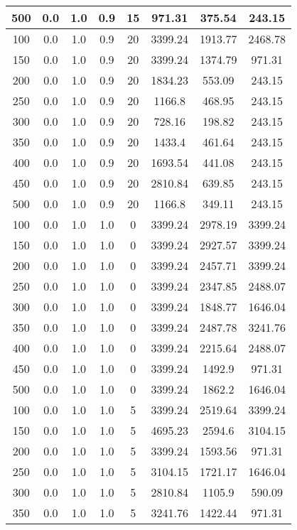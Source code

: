 \documentclass[a4paper, 12pt]{extreport}
\begin{document}
\begin{itemize}
\begin{longtable}{|c|c|c|c|c|c|c|c|}
			500 & 0.0 & 1.0 & 0.9 & 15 & 971.31 & 375.54 & 243.15 \\\hline
			100 & 0.0 & 1.0 & 0.9 & 20 & 3399.24 & 1913.77 & 2468.78 \\\hline
			150 & 0.0 & 1.0 & 0.9 & 20 & 3399.24 & 1374.79 & 971.31 \\\hline
			200 & 0.0 & 1.0 & 0.9 & 20 & 1834.23 & 553.09 & 243.15 \\\hline
			250 & 0.0 & 1.0 & 0.9 & 20 & 1166.8 & 468.95 & 243.15 \\\hline
			300 & 0.0 & 1.0 & 0.9 & 20 & 728.16 & 198.82 & 243.15 \\\hline
			350 & 0.0 & 1.0 & 0.9 & 20 & 1433.4 & 461.64 & 243.15 \\\hline
			400 & 0.0 & 1.0 & 0.9 & 20 & 1693.54 & 441.08 & 243.15 \\\hline
			450 & 0.0 & 1.0 & 0.9 & 20 & 2810.84 & 639.85 & 243.15 \\\hline
			500 & 0.0 & 1.0 & 0.9 & 20 & 1166.8 & 349.11 & 243.15 \\\hline
			100 & 0.0 & 1.0 & 1.0 & 0 & 3399.24 & 2978.19 & 3399.24 \\\hline
			150 & 0.0 & 1.0 & 1.0 & 0 & 3399.24 & 2927.57 & 3399.24 \\\hline
			200 & 0.0 & 1.0 & 1.0 & 0 & 3399.24 & 2457.71 & 3399.24 \\\hline
			250 & 0.0 & 1.0 & 1.0 & 0 & 3399.24 & 2347.85 & 2488.07 \\\hline
			300 & 0.0 & 1.0 & 1.0 & 0 & 3399.24 & 1848.77 & 1646.04 \\\hline
			350 & 0.0 & 1.0 & 1.0 & 0 & 3399.24 & 2487.78 & 3241.76 \\\hline
			400 & 0.0 & 1.0 & 1.0 & 0 & 3399.24 & 2215.64 & 2488.07 \\\hline
			450 & 0.0 & 1.0 & 1.0 & 0 & 3399.24 & 1492.9 & 971.31 \\\hline
			500 & 0.0 & 1.0 & 1.0 & 0 & 3399.24 & 1862.2 & 1646.04 \\\hline
			100 & 0.0 & 1.0 & 1.0 & 5 & 3399.24 & 2519.64 & 3399.24 \\\hline
			150 & 0.0 & 1.0 & 1.0 & 5 & 4695.23 & 2594.6 & 3104.15 \\\hline
			200 & 0.0 & 1.0 & 1.0 & 5 & 3399.24 & 1593.56 & 971.31 \\\hline
			250 & 0.0 & 1.0 & 1.0 & 5 & 3104.15 & 1721.17 & 1646.04 \\\hline
			300 & 0.0 & 1.0 & 1.0 & 5 & 2810.84 & 1105.9 & 590.09 \\\hline
			350 & 0.0 & 1.0 & 1.0 & 5 & 3241.76 & 1422.44 & 971.31 \\\hline

\end{longtable}
\end{itemize}
\end{document}
